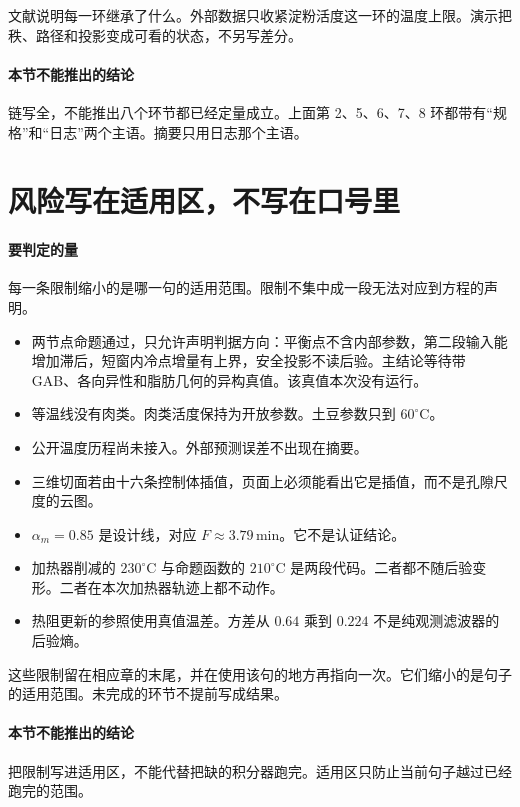 文献说明每一环继承了什么。外部数据只收紧淀粉活度这一环的温度上限。演示把秩、路径和投影变成可看的状态，不另写差分。

\paragraph{本节不能推出的结论}
链写全，不能推出八个环节都已经定量成立。上面第 2、5、6、7、8 环都带有“规格”和“日志”两个主语。摘要只用日志那个主语。

\section{风险写在适用区，不写在口号里}

\paragraph{要判定的量}
每一条限制缩小的是哪一句的适用范围。限制不集中成一段无法对应到方程的声明。

\begin{itemize}
\item 两节点命题通过，只允许声明判据方向：平衡点不含内部参数，第二段输入能增加滞后，短窗内冷点增量有上界，安全投影不读后验。主结论等待带 GAB、各向异性和脂肪几何的异构真值。该真值本次没有运行。
\item 等温线没有肉类。肉类活度保持为开放参数。土豆参数只到 \(60^\circ\mathrm{C}\)。
\item 公开温度历程尚未接入。外部预测误差不出现在摘要。
\item 三维切面若由十六条控制体插值，页面上必须能看出它是插值，而不是孔隙尺度的云图。
\item \(\alpha_m=0.85\) 是设计线，对应 \(F\approx 3.79\,\mathrm{min}\)。它不是认证结论。
\item 加热器削减的 \(230^\circ\mathrm{C}\) 与命题函数的 \(210^\circ\mathrm{C}\) 是两段代码。二者都不随后验变形。二者在本次加热器轨迹上都不动作。
\item 热阻更新的参照使用真值温差。方差从 \(0.64\) 乘到 \(0.224\) 不是纯观测滤波器的后验熵。
\end{itemize}

这些限制留在相应章的末尾，并在使用该句的地方再指向一次。它们缩小的是句子的适用范围。未完成的环节不提前写成结果。

\paragraph{本节不能推出的结论}
把限制写进适用区，不能代替把缺的积分器跑完。适用区只防止当前句子越过已经跑完的范围。
